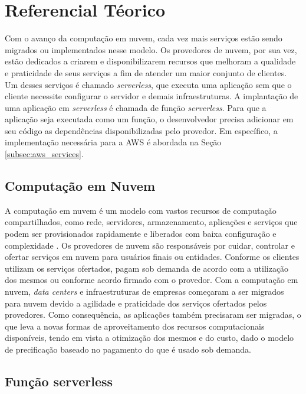 \documentclass[conference]{IEEEtran}
\begin{document}
\section{Referencial Téorico} 
\label{sec:RefTeo}

Com o avanço da computação em nuvem, cada vez mais serviços estão sendo migrados ou implementados nesse modelo. Os provedores de nuvem, por sua vez, estão dedicados a criarem e disponibilizarem recursos que melhoram a qualidade e praticidade de seus serviços a fim de atender um maior conjunto de clientes. Um desses serviços é chamado \textit{serverless}, que executa uma aplicação sem que o cliente necessite configurar o servidor e demais infraestruturas. A implantação de uma aplicação em \textit{serverless} é chamada de função \textit{serverless}. Para que a aplicação seja executada como um função, o desenvolvedor precisa adicionar em seu código as dependências disponibilizadas pelo provedor. Em específico, a implementação necessária para a AWS é abordada na Seção \ref{subsec:aws_services}.
    
\subsection{Computação em Nuvem}
\label{subsec:cloud}

A computação em nuvem é um modelo com vastos recursos de computação compartilhados, como rede, servidores, armazenamento, aplicações e serviços que podem ser provisionados rapidamente e liberados com baixa configuração e complexidade \cite{nist_2011_cloud_computing}.
Os provedores de nuvem são responsáveis por cuidar, controlar e ofertar serviços em nuvem para usuários finais ou entidades. Conforme os clientes utilizam os serviços ofertados, pagam sob demanda de acordo com a utilização dos mesmos ou conforme acordo firmado com o provedor. Com a computação em nuvem, \textit{data centers} e infraestruturas de empresas começaram a ser migrados para nuvem devido a agilidade e praticidade dos serviços ofertados pelos provedores. Como consequência, as aplicações também precisaram ser migradas, o que leva a novas formas de aproveitamento dos recursos computacionais disponíveis, tendo em vista a otimização dos mesmos e do custo, dado o modelo de precificação baseado no pagamento do que é usado sob demanda.

\subsection{Função serverless}
\label{subsec:serverless_funcion}
\end{document}
